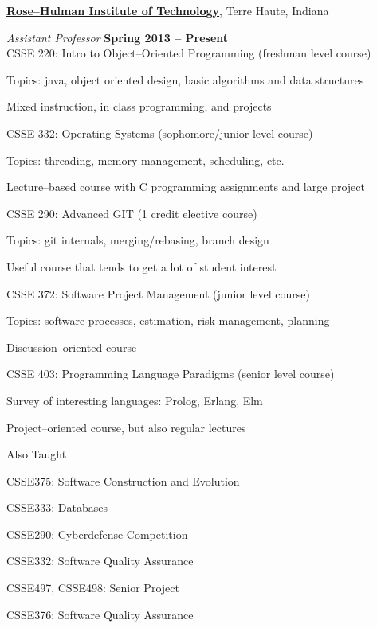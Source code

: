 \documentclass[10pt]{article}
\newenvironment{outerlist}[1][\enskip\textbullet]%
        {\begin{itemize}[#1]}{\end{itemize}%
         \vspace{-.6\baselineskip}}
\newenvironment{innerlist}[1][\enskip\textbullet]%
        {\begin{compactitem}[#1]}{\end{compactitem}}
\begin{document}
\href{http://www.rose-hulman.edu}{\textbf{Rose--Hulman Institute of Technology}},
Terre Haute, Indiana
\begin{outerlist}
\item[] \textit{Assistant Professor}%
    \hfill \textbf{Spring 2013 -- Present}\\

    CSSE 220: Intro to Object--Oriented Programming (freshman level course)
    \begin{innerlist}
    \item Topics: java, object oriented design, basic algorithms and data structures
    \item Mixed instruction, in class programming, and projects
    \end{innerlist}

    CSSE 332: Operating Systems (sophomore/junior level course)
    \begin{innerlist}
    \item Topics: threading, memory management, scheduling, etc.
    \item Lecture--based course with C programming assignments and large project
    \end{innerlist}
    
    CSSE 290: Advanced GIT (1 credit elective course)
    \begin{innerlist}
    \item Topics: git internals, merging/rebasing, branch design
    \item Useful course that tends to get a lot of student interest
    \end{innerlist}

    CSSE 372: Software Project Management (junior level course)
    \begin{innerlist}
    \item Topics: software processes, estimation, risk management, planning
    \item Discussion--oriented course
    \end{innerlist}

    CSSE 403: Programming Language Paradigms (senior level course)
    \begin{innerlist}
    \item Survey of interesting languages: Prolog, Erlang, Elm
    \item Project--oriented course, but also regular lectures
    \end{innerlist}

    Also Taught
    \begin{innerlist}
    \item CSSE375: Software Construction and Evolution
    \item CSSE333: Databases 
    \item CSSE290: Cyberdefense Competition
    \item CSSE332: Software Quality Assurance
    \item CSSE497, CSSE498: Senior Project
    \item CSSE376: Software Quality Assurance
    \end{innerlist}


\end{outerlist}
\end{document}
